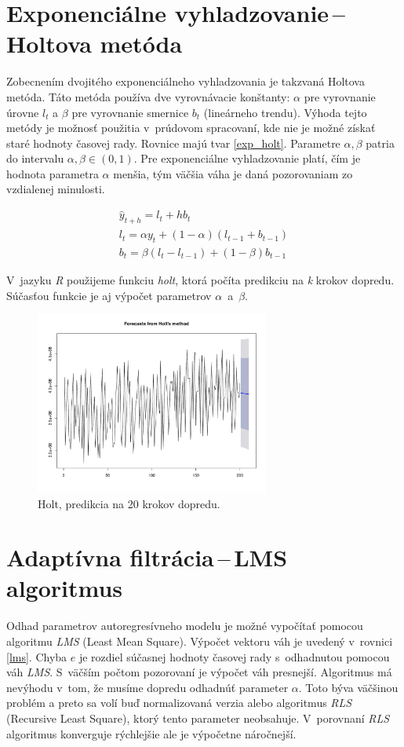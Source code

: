 \documentclass[12pt,a4paper,oneside,final]{article}
\theoremstyle{definition}
\theoremstyle{remark}
\numberwithin{equation}{section}
\begin{document}
\section{Exponenciálne vyhladzovanie\,--\,Holtova metóda}
Zobecnením dvojitého exponenciálneho vyhladzovania je takzvaná Holtova metóda.
Táto metóda používa dve vyrovnávacie konštanty: $\alpha$ pre vyrovnanie úrovne $l_t$
a $\beta$ pre vyrovnanie smernice $b_t$ (lineárneho trendu).
Výhoda tejto metódy je možnosť použitia v~prúdovom spracovaní, kde nie je možné získať staré hodnoty časovej rady. 
Rovnice majú tvar \ref{exp_holt}. Parametre $\alpha, \beta$ patria do intervalu 
$\alpha,\beta \in (0,1)$. Pre exponenciálne vyhladzovanie platí, 
čím je hodnota parametra $\alpha$ menšia, tým väčšia váha je daná pozorovaniam zo
vzdialenej minulosti.

\begin{eqnarray} \label{exp_holt}
    \hat{y}_{t+h} = l_{t} + hb_{t} \\
    \nonumber l_t = \alpha y_t + (1 - \alpha) (l_{t-1} + b_{t-1}) \\
    \nonumber b_t = \beta (l_t - l_{t-1}) + (1 - \beta)b_{t-1} 
\end{eqnarray}
 
V~jazyku \emph{R} použijeme funkciu \emph{holt}, ktorá počíta predikciu na \emph{k} krokov 
dopredu. Súčasťou funkcie je aj výpočet parametrov $\alpha$~a~$\beta$.

\begin{figure}[H]
    \begin{center}
        \includegraphics[width=.8\textwidth,height=6cm]{images/heap_holt.pdf}
        \caption{Holt, predikcia na 20 krokov dopredu.}
        \label{obr:heap_holt}
    \end{center}
\end{figure}

\section{Adaptívna filtrácia\,--\,LMS algoritmus}
Odhad parametrov autoregresívneho modelu je možné vypočítať 
pomocou algoritmu \emph{LMS} (Least Mean Square). Výpočet vektoru váh je uvedený
v~rovnici \ref{lms}. Chyba $e$ je rozdiel súčasnej hodnoty časovej rady s~odhadnutou pomocou
váh \emph{LMS}. S~väčším počtom pozorovaní je výpočet váh presnejší. Algoritmus 
má nevýhodu v~tom, že musíme dopredu odhadnúť parameter $\alpha$. Toto býva väčšinou problém 
a preto sa volí buď normalizovaná verzia alebo algoritmus \emph{RLS} (Recursive Least
Square), ktorý tento parameter neobsahuje. V~porovnaní \emph{RLS} algoritmus konverguje
rýchlejšie ale je výpočetne náročnejší.  
\end{document}
